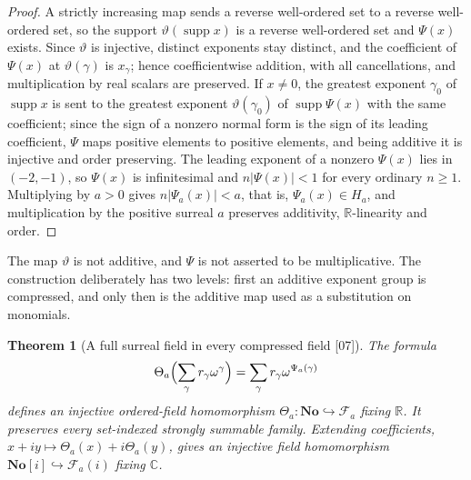 \documentclass[11pt,letterpaper]{article}
\numberwithin{equation}{section}
\newtheorem{theorem}{Theorem}[section]
\theoremstyle{definition}
\theoremstyle{remark}
\theoremstyle{plain}
\newcommand{\No}{\mathbf{No}}
\newcommand{\SC}{\No[i]}
\newcommand{\R}{\mathbb R}
\newcommand{\C}{\mathbb C}
\newcommand{\FF}{\mathscr F}         %
\newcommand{\supp}{\operatorname{supp}}
\newcommand{\src}[1]{\textup{\textsf{[#1]}}}
\begin{document}
\begin{proof}
A strictly increasing map sends a reverse well-ordered set to a reverse well-ordered set,
so the support $\vartheta(\supp x)$ is a reverse well-ordered set and $\Psi(x)$ exists.
Since $\vartheta$ is injective, distinct exponents stay distinct, and the coefficient of
$\Psi(x)$ at $\vartheta(\gamma)$ is $x_\gamma$; hence coefficientwise addition, with all
cancellations, and multiplication by real scalars are preserved. If $x\ne0$, the greatest
exponent $\gamma_0$ of $\supp x$ is sent to the greatest exponent $\vartheta(\gamma_0)$ of
$\supp\Psi(x)$ with the same coefficient; since the sign of a nonzero normal form is the
sign of its leading coefficient, $\Psi$ maps positive elements to positive elements, and
being additive it is injective and order preserving. The leading exponent of a nonzero
$\Psi(x)$ lies in $(-2,-1)$, so $\Psi(x)$ is infinitesimal and $n|\Psi(x)|<1$ for every
ordinary $n\ge1$. Multiplying by $a>0$ gives $n|\Psi_a(x)|<a$, that is,
$\Psi_a(x)\in H_a$, and multiplication by the positive surreal $a$ preserves additivity,
$\R$-linearity and order.
\end{proof}

The map $\vartheta$ is not additive, and $\Psi$ is not asserted to be multiplicative. The
construction deliberately has two levels: first an additive exponent group is compressed,
and only then is the additive map used as a substitution on monomials.

\begin{theorem}[A full surreal field in every compressed field \src{07}]
\label{osq:if:thm:compression}
The formula
\begin{equation}\label{osq:if:eq:Theta}
 \Theta_a\Bigl(\sum_\gamma r_\gamma\omega^\gamma\Bigr)=\sum_\gamma r_\gamma\omega^{\Psi_a(\gamma)}
\end{equation}
defines an injective ordered-field homomorphism $\Theta_a:\No\hookrightarrow\FF_a$ fixing
$\R$. It preserves every set-indexed strongly summable family. Extending coefficients,
$x+iy\mapsto\Theta_a(x)+i\Theta_a(y)$, gives an injective field homomorphism
$\SC\hookrightarrow\FF_a(i)$ fixing $\C$.
\end{theorem}
\end{document}
